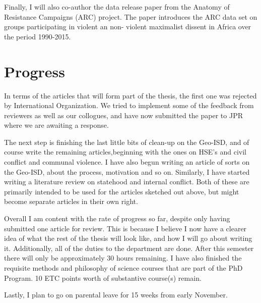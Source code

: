 \documentclass[12pt]{article}
\begin{document}
Finally, I will also co-author the data release paper from the Anatomy of 
Resistance Campaigns (ARC) project.
The paper introduces the ARC data set on groups participating in violent an non-
violent maximalist dissent in Africa over the period 1990-2015.




\section{Progress}

In terms of the articles that will form part of the thesis, the first one was
rejected by International Organization. We tried to implement some of the
feedback from reviewers as well as our collogues, and have now submitted the
paper to JPR where we are awaiting a response.  

The next step is finishing the last little bits of clean-up on the Geo-ISD, and
of course write the remaining articles,beginning with the ones on HSE's and
civil conflict and communal violence. I have also begun writing an article of
sorts on the Geo-ISD, about the process, motivation and so on. Similarly, I have
started writing a literature review on statehood and internal conflict. Both of
these are primarily intended to be used for the articles sketched out above,
but might become separate articles in their own right.

Overall I am content with the rate of progress so far, despite only having 
submitted one article for review.
This is because I believe I now have a clearer idea of what the rest of the 
thesis will look like, and how I will go about writing it.
Additionally, all of the duties to the department are done.
After this semester there will only be approximately 30 hours remaining.
I have also finished the requisite methods and philosophy of science courses 
that are part of the PhD Program.
10 ETC points worth of substantive course(s) remain.

Lastly, I plan to go on parental leave for 15 weeks from early November.

\pagebreak


\end{document}
